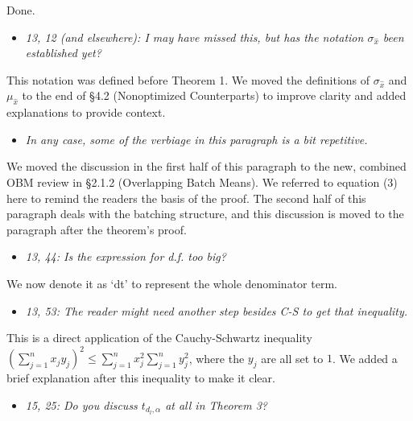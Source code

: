 \documentclass[11pt,notitlepage,onecolumn]{article}
\newcommand{\noi}{\noindent}
\begin{document}
\noi
Done.
\medskip 



\begin{itemize}
\item[] \textit{13, 12 (and elsewhere): I may have missed this, but has the notation $\sigma_{\hat{x}}$ been established yet?}
\end{itemize}

\noi
This notation was defined before Theorem 1. 
We moved the definitions of $\sigma_{\hat{x}}$ and $\mu_{\hat{x}}$ to the end of \S 4.2 (Nonoptimized Counterparts) to improve clarity and added explanations to provide context. 
\medskip 



\begin{itemize}
\item[] \textit{In any case, some of the verbiage in this paragraph is a bit repetitive.}
\end{itemize}

\noi
We moved the discussion in the first half of this paragraph to the new, combined OBM review in \S 2.1.2 (Overlapping Batch Means). 
We referred to equation (3) here to remind the readers the basis of the proof.
The second half of this paragraph deals with the batching structure, and this discussion is moved to the paragraph after the theorem's proof. 
\medskip 



\begin{itemize}
\item[] \textit{13, 44: Is the expression for d.f. too big?}
\end{itemize}

\noi
We now denote it as `dt' to represent the whole denominator term. 
\medskip 



\begin{itemize}
\item[] \textit{13, 53: The reader might need another step besides C-S to get that inequality.}
\end{itemize}

\noi
This is a direct application of the Cauchy-Schwartz inequality $\left(\sum_{j=1}^{n}x_j y_j\right)^2 \leq \sum_{j=1}^{n}x_j^2 \sum_{j=1}^{n}y_j^2$, where the $y_j$ are all set to $1$. 
We added a brief explanation after this inequality to make it clear. 
\medskip 



\begin{itemize}
\item[] \textit{15, 25: Do you discuss $t_{d_l,\alpha}$ at all in Theorem 3?}
\end{itemize}
\end{document}

